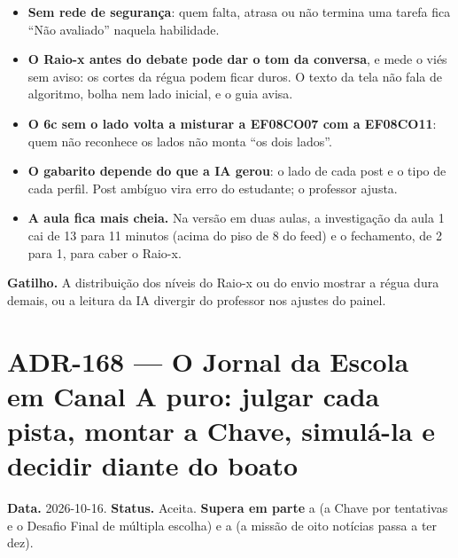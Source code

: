 \begin{itemize}
  \item \textbf{Sem rede de segurança}: quem falta, atrasa ou não termina uma
    tarefa fica \enquote{Não avaliado} naquela habilidade.
  \item \textbf{O Raio-x antes do debate pode dar o tom da conversa}, e mede o
    viés sem aviso: os cortes da régua podem ficar duros. O texto da tela não
    fala de algoritmo, bolha nem lado inicial, e o guia avisa.
  \item \textbf{O 6c sem o lado volta a misturar a EF08CO07 com a EF08CO11}:
    quem não reconhece os lados não monta \enquote{os dois lados}.
  \item \textbf{O gabarito depende do que a IA gerou}: o lado de cada post e o
    tipo de cada perfil. Post ambíguo vira erro do estudante; o professor
    ajusta.
  \item \textbf{A aula fica mais cheia.} Na versão em duas aulas, a
    investigação da aula 1 cai de 13 para 11 minutos (acima do piso de 8 do
    feed) e o fechamento, de 2 para 1, para caber o Raio-x.
\end{itemize}

\textbf{Gatilho.} A distribuição dos níveis do Raio-x ou do envio mostrar a
régua dura demais, ou a leitura da IA divergir do professor nos ajustes do
painel.


\section{ADR-168 --- O Jornal da Escola em Canal A puro: julgar cada pista, montar a Chave, simulá-la e decidir diante do boato}
\label{adr:exp04ef1b-canal-a}

\textbf{Data.} 2026-10-16. \textbf{Status.} Aceita. \textbf{Supera em parte}
a  (a Chave por tentativas e o Desafio Final de múltipla
escolha) e a  (a missão de oito notícias passa a ter dez).

